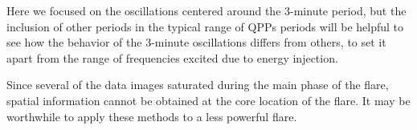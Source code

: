 






Here we focused on the oscillations centered around the 3-minute period,
but the inclusion of other periods in the typical range of QPPs periods
will be helpful to see how the behavior of the 3-minute oscillations differs
from others, to set it apart from the range of frequencies excited due
to energy injection.

Since several of the data images saturated during the main phase of the flare,
spatial information cannot be obtained at the core location of the flare.
It may be worthwhile to apply these methods to a less powerful flare.

